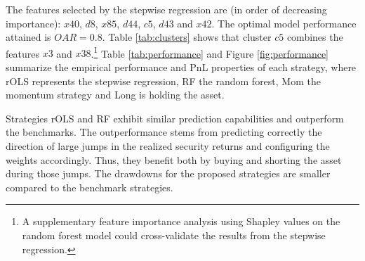 \documentclass[12pt]{article}
\begin{document}
The features selected by the stepwise regression are (in order of decreasing importance): $x40$, $d8$, $x85$, $d44$, $c5$, $d43$ and $x42$. The optimal model performance attained is $OAR=0.8$. Table \ref{tab:clusters} shows that cluster $c5$ combines the features $x3$ and $x38$.\footnote{A supplementary feature importance analysis using Shapley values on the random forest model could cross-validate the results from the stepwise regression.} Table \ref{tab:performance} and Figure \ref{fig:performance} summarize the empirical performance and PnL properties of each strategy, where rOLS represents the stepwise regression, RF the random forest, Mom the momentum strategy and Long is holding the asset.

Strategies rOLS and RF exhibit similar prediction capabilities and outperform the benchmarks. The outperformance stems from predicting correctly the direction of large jumps in the realized security returns and configuring the weights accordingly. Thus, they benefit both by buying and shorting the asset during those jumps. The drawdowns for the proposed strategies are smaller compared to the benchmark strategies.
\end{document}
